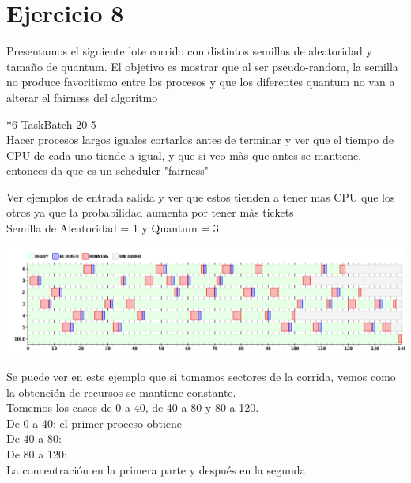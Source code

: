 \section{Ejercicio 8}

Presentamos el siguiente lote corrido con distintos semillas de aleatoridad y tamaño de quantum.
El objetivo es mostrar que al ser pseudo-random, la semilla no produce favoritismo entre los procesos y que los diferentes quantum no van a alterar el fairness del algoritmo

*6 TaskBatch 20 5 \\

Hacer procesos largos iguales cortarlos antes de terminar y ver que el tiempo de CPU de cada uno tiende a igual, y que si veo màs que antes se mantiene, 
entonces da que es un scheduler "fairness"

Ver ejemplos de entrada salida y ver que estos tienden a tener mas CPU que los otros ya que la probabilidad aumenta por tener màs tickets\\

Semilla de Aleatoridad = 1 y Quantum = 3
\begin {center}
\includegraphics[width=16cm]{../simusched/outputs/ej8/sl-ej8-1-3.png}
\end {center}
Se puede ver en este ejemplo que si tomamos sectores de la corrida, vemos como la obtención de recursos se mantiene constante.\\
Tomemos los casos de 0 a 40, de 40 a 80 y 80 a 120.\\
De 0 a 40: el primer proceso obtiene \\
De 40 a 80:                           \\
De 80 a 120:                          \\

La concentración en la primera parte y después en la segunda

